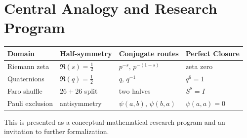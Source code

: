\documentclass[11pt]{article}
\begin{document}
\section{Central Analogy and Research Program}

\begin{center}
\begin{tabular}{|l|l|l|l|}
\hline
Domain & Half-symmetry & Conjugate routes & Perfect Closure \\
\hline
Riemann zeta & $\Re(s)=\tfrac{1}{2}$ & $p^{-s},\,p^{-(1-s)}$ & zeta zero \\
Quaternions & $\Re(q)=\tfrac{1}{2}$ & $q,\,q^{-1}$ & $q^6=1$ \\
Faro shuffle & $26+26$ split & two halves & $S^8=I$ \\
Pauli exclusion & antisymmetry & $\psi(a,b),\,\psi(b,a)$ & $\psi(a,a)=0$ \\
\hline
\end{tabular}
\end{center}

This is presented as a conceptual-mathematical research program and an invitation to further formalization.

\printbibliography
\end{document}
